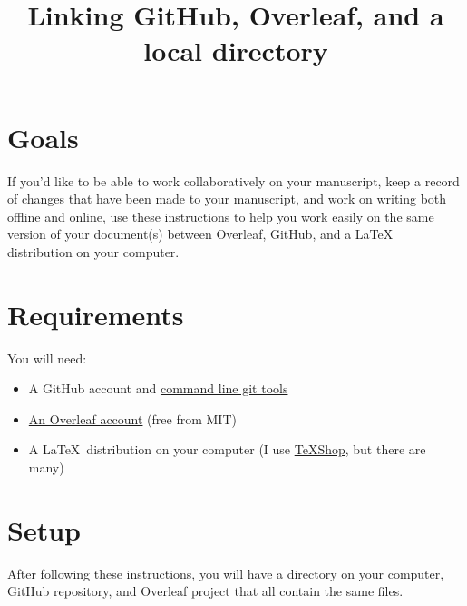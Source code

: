 \documentclass[10pt]{article}
\title{Linking GitHub, Overleaf, and a local directory}
\begin{document}
\maketitle
\section{Goals}
If you'd like to be able to work collaboratively on your manuscript, keep a record of changes that have been made to your manuscript, and work on writing both offline and online, use these instructions to help you work easily on the same version of your document(s) between Overleaf, GitHub, and a \LaTeX~ distribution on your computer.

\section{Requirements}
You will need:
\begin{itemize}
\item A GitHub account and \href{https://git-scm.com/book/en/v2/Getting-Started-Installing-Git}{command line git tools}
\item \href{https://www.overleaf.com/edu/mit}{An Overleaf account} (free from MIT)
\item A \LaTeX~distribution on your computer (I use \href{https://pages.uoregon.edu/koch/texshop/}{TeXShop}, but there are many)
\end{itemize}

\section{Setup}
After following these instructions, you will have a directory on your computer, GitHub repository, and Overleaf project that all contain the same files.
\end{document}
